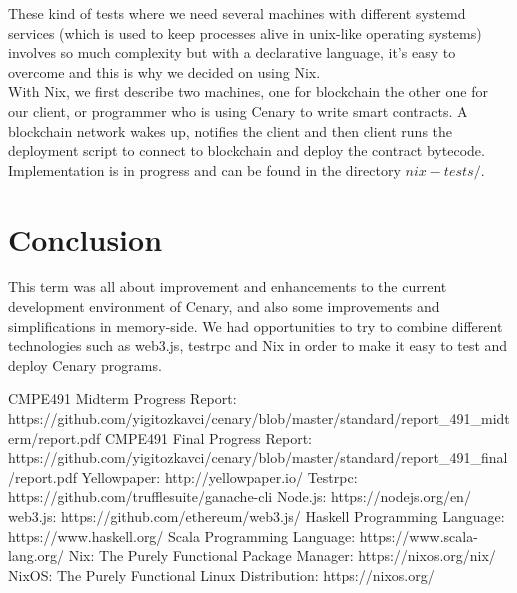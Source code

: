 \documentclass{article}
\begin{document}
These kind of tests where we need several machines with different systemd services (which is used to keep processes alive in unix-like operating systems) involves so much complexity but with a declarative language, it's easy to overcome and this is why we decided on using Nix. \\

With Nix, we first describe two machines, one for blockchain the other one for our client, or programmer who is using Cenary to write smart contracts. A blockchain network wakes up, notifies the client and then client runs the deployment script to connect to blockchain and deploy the contract bytecode. \\

Implementation is in progress and can be found in the directory $nix-tests/$.

\section{Conclusion}
This term was all about improvement and enhancements to the current development environment of Cenary, and also some improvements and simplifications in memory-side. We had opportunities to try to combine different technologies such as web3.js, testrpc and Nix in order to make it easy to test and deploy Cenary programs.
\newpage
\begin{thebibliography}{2}
  CMPE491 Midterm Progress Report:
  \\ https://github.com/yigitozkavci/cenary/blob/master/standard/report\_491\_midterm/report.pdf
  CMPE491 Final Progress Report:
  \\ https://github.com/yigitozkavci/cenary/blob/master/standard/report\_491\_final/report.pdf
  Yellowpaper: http://yellowpaper.io/
  Testrpc: https://github.com/trufflesuite/ganache-cli
  Node.js: https://nodejs.org/en/
  web3.js: https://github.com/ethereum/web3.js/
  Haskell Programming Language: https://www.haskell.org/
  Scala Programming Language: https://www.scala-lang.org/
  Nix: The Purely Functional Package Manager: https://nixos.org/nix/
  NixOS: The Purely Functional Linux Distribution: https://nixos.org/
\end{thebibliography}
\end{document}
